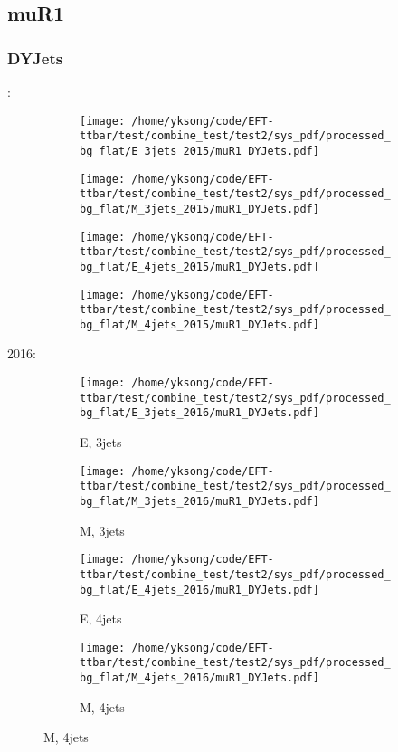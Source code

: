 \documentclass{beamer}
\begin{document}
\subsection{muR1}

\begin{frame}
\frametitle{DYJets}
\fontsize{5}{1}:
\begin{figure}
\centering
\begin{subfigure}[b]{0.24\textwidth}
\texttt{[image: /home/yksong/code/EFT-ttbar/test/combine\_test/test2/sys\_pdf/processed\_bg\_flat/E\_3jets\_2015/muR1\_DYJets.pdf]}
\end{subfigure}
\begin{subfigure}[b]{0.24\textwidth}
\texttt{[image: /home/yksong/code/EFT-ttbar/test/combine\_test/test2/sys\_pdf/processed\_bg\_flat/M\_3jets\_2015/muR1\_DYJets.pdf]}
\end{subfigure}
\begin{subfigure}[b]{0.24\textwidth}
\texttt{[image: /home/yksong/code/EFT-ttbar/test/combine\_test/test2/sys\_pdf/processed\_bg\_flat/E\_4jets\_2015/muR1\_DYJets.pdf]}
\end{subfigure}
\begin{subfigure}[b]{0.24\textwidth}
\texttt{[image: /home/yksong/code/EFT-ttbar/test/combine\_test/test2/sys\_pdf/processed\_bg\_flat/M\_4jets\_2015/muR1\_DYJets.pdf]}
\end{subfigure}
\end{figure}
2016:
\begin{figure}
\centering
\begin{subfigure}[b]{0.24\textwidth}
\texttt{[image: /home/yksong/code/EFT-ttbar/test/combine\_test/test2/sys\_pdf/processed\_bg\_flat/E\_3jets\_2016/muR1\_DYJets.pdf]}
\captionsetup{font=tiny}
\caption{E, 3jets}
\end{subfigure}
\begin{subfigure}[b]{0.24\textwidth}
\texttt{[image: /home/yksong/code/EFT-ttbar/test/combine\_test/test2/sys\_pdf/processed\_bg\_flat/M\_3jets\_2016/muR1\_DYJets.pdf]}
\captionsetup{font=tiny}
\caption{M, 3jets}
\end{subfigure}
\begin{subfigure}[b]{0.24\textwidth}
\texttt{[image: /home/yksong/code/EFT-ttbar/test/combine\_test/test2/sys\_pdf/processed\_bg\_flat/E\_4jets\_2016/muR1\_DYJets.pdf]}
\captionsetup{font=tiny}
\caption{E, 4jets}
\end{subfigure}
\begin{subfigure}[b]{0.24\textwidth}
\texttt{[image: /home/yksong/code/EFT-ttbar/test/combine\_test/test2/sys\_pdf/processed\_bg\_flat/M\_4jets\_2016/muR1\_DYJets.pdf]}
\captionsetup{font=tiny}
\caption{M, 4jets}
\end{subfigure}
\end{figure}
\end{frame}
\end{document}
